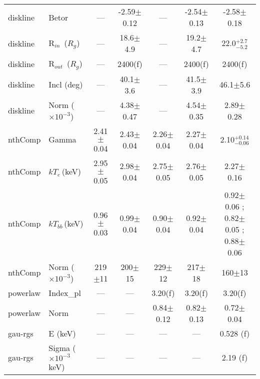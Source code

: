 \documentclass{aa}
\begin{document}
\begin{table*}
\begin{tabular}{llccccc}
diskline & 
Betor  & 
--- &
-2.59$\pm$0.12&
---&
-2.54$\pm$0.13 &
-2.58$\pm$0.18  \\


diskline & 
R$_{in}\,$ ($R_g$) &
--- & 
18.6$\pm$4.9&
---&
19.2$\pm$4.7 &
22.0$^{+2.7}_{-5.2}$ \\

diskline & 
R$_{out}\,$ ($R_g$)  & 
--- &
2400(f) & 
---&
2400(f) &
2400(f)\\

diskline & 
Incl (deg)   & 
---&
40.1$\pm$3.6 &
---&
41.5$\pm$3.9 &
46.1$\pm$5.6 \\





diskline & 
Norm ($\times10^{-3}$)   & 
---&
4.38$\pm$0.47 &
---&
4.54$\pm$0.35 &
2.89$\pm$0.28 \\


\hline

nthComp &
Gamma   & 
2.41$\pm$0.04&
2.43$\pm$0.04 &
2.26$\pm$0.04&
2.27$\pm$0.04 &
2.10$^{+0.14}_{-0.06}$  \\


nthComp & 
$kT_{e}\,$(keV) & 
2.95$\pm$0.05 &
2.98$\pm$0.04 &
2.75$\pm$0.05 &
2.76$\pm$0.05&
2.27$\pm$0.16\\

  
  
nthComp & 
$kT_{bb}\,$(keV) & 
0.96$\pm$0.03& 
0.99$\pm$0.04 &
0.90$\pm$0.04& 
0.92$\pm$0.04 &  
0.92$\pm$0.06 ; 0.82$\pm$0.05 ; 0.88$\pm$0.06\\  
  
  
  

nthComp & 
Norm ($\times10^{-3}$)   & 
219$\pm$11&
200$\pm$15 &
229$\pm$12&
217$\pm$18  &
160$\pm$13  \\



\hline
 
 
 
 
powerlaw  &  
Index\_pl &
--- &
--- &
3.20(f) &
3.20(f) &
3.20(f) \\


powerlaw  &  
Norm &
--- &
---&
0.84$\pm$0.12 &
0.82$\pm$0.13 &
0.72$\pm$0.04 \\


\hline


gau-rgs & 
E (keV)   & 
--- &
--- &
--- &
--- &
0.528 (f)\\

gau-rgs & 
Sigma ($\times10^{-3}$ keV)   & 
---&
--- &
--- &
--- &
2.19 (f) \\


\end{tabular}
\end{table*}
\end{document}
